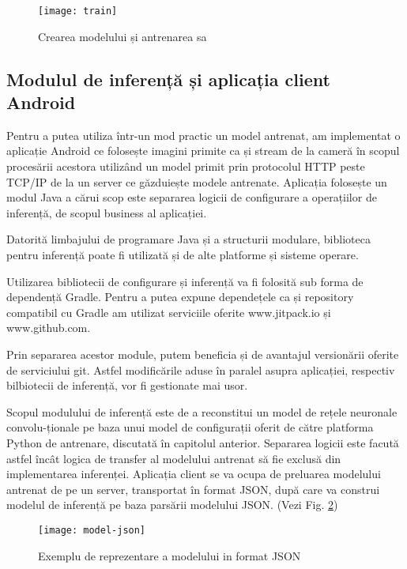 	\begin{figure}[H]
		\texttt{[image: train]}
		\caption{\label{fig:train} Crearea modelului și antrenarea sa}
	\end{figure}
	
	\newpage
	\subsection{Modulul de inferență și aplicația client Android}
	
	Pentru a putea utiliza într-un mod practic un model antrenat, am implementat o aplicație Android ce folosește imagini primite ca și stream de la cameră în scopul procesării acestora utilizând un model primit prin protocolul HTTP peste TCP/IP de la un server ce găzduiește modele antrenate. 
	Aplicația folosește un modul Java a cărui scop este separarea logicii de configurare a operațiilor de inferență, de scopul business al aplicației. \newline
	
	Datorită limbajului de programare Java și a structurii modulare, biblioteca pentru inferență poate fi utilizată și de alte platforme și sisteme operare.
	
	Utilizarea bibliotecii de configurare și inferență va fi folosită sub forma de dependență Gradle. Pentru a putea expune dependețele ca și repository compatibil cu Gradle am utilizat serviciile oferite www.jitpack.io și www.github.com. 
	
	Prin separarea acestor module, putem beneficia și de avantajul versionării oferite de serviciului git. Astfel modificările aduse în paralel asupra aplicației, respectiv bilbiotecii de inferență, vor fi gestionate mai usor.
	
	Scopul modulului de inferență este de a reconstitui un model de rețele neuronale convolu-\newline ționale pe baza unui model de configurații oferit de către platforma Python de antrenare, discutată în capitolul anterior. Separarea logicii este facută astfel încât logica de transfer al modelului antrenat să fie exclusă din implementarea inferenței. Aplicația client se va ocupa de preluarea modelului antrenat de pe un server, transportat în format JSON, după care va construi modelul de inferență pe baza parsării modelului JSON. (Vezi Fig. \ref{fig:model-json})
	
	\vfill
	
	\begin{figure}[H]
		\texttt{[image: model-json]}
		\caption{\label{fig:model-json} Exemplu de reprezentare a modelului in format JSON}
	\end{figure}


